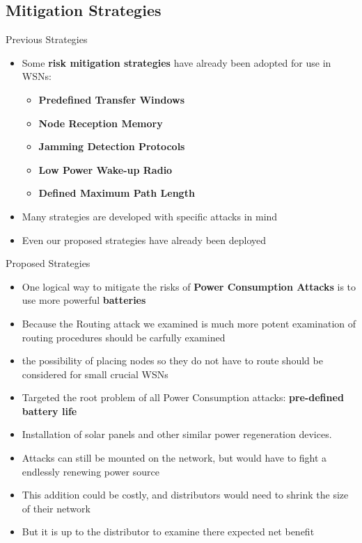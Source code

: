 \documentclass{beamer}
\begin{document}
\subsection{Mitigation Strategies}

\begin{frame}{Previous Strategies}

\begin{itemize}

	\item Some \textbf{risk mitigation strategies} have already been adopted for use in WSNs:
	\begin{itemize}
		\item \textbf{Predefined Transfer Windows}
		\item \textbf{Node Reception Memory}
		\item \textbf{Jamming Detection Protocols}
		\item \textbf{Low Power Wake-up Radio}
		\item \textbf{Defined Maximum Path Length}
	\end{itemize}
	\item Many strategies are developed with specific attacks in mind
	\item Even our proposed strategies have already been deployed
	
\end{itemize}

\end{frame}

\begin{frame}{Proposed Strategies}

\begin{itemize}

	\item One logical way to mitigate the risks of \textbf{Power Consumption Attacks} is to use more powerful \textbf{batteries}
	\item Because the Routing attack we examined is much more potent examination of routing procedures should be carfully examined
	\item the possibility of placing nodes so they do not have to route should be considered for small crucial WSNs
	\item Targeted the root problem of all Power Consumption attacks: \textbf{pre-defined battery life}
	\item Installation of solar panels and other similar power regeneration devices.
	\item Attacks can still be mounted on the network, but would have to fight a endlessly renewing power source 
	\item This addition could be costly, and distributors would need to shrink the size of their network
	\item But it is up to the distributor to examine there expected net benefit
	
\end{itemize}

\end{frame}
\end{document}
